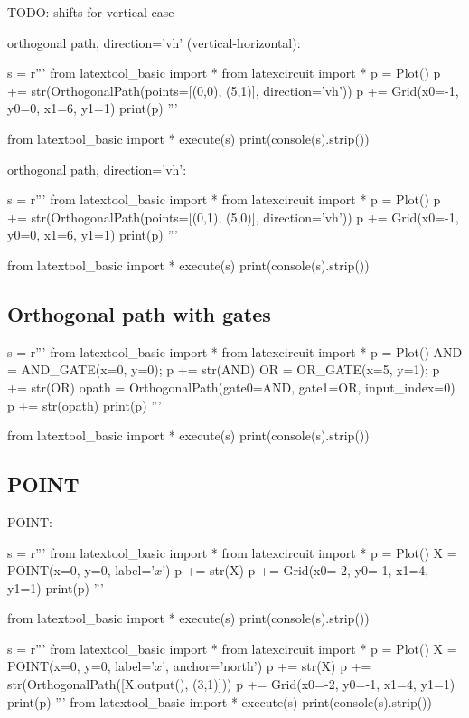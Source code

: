 TODO: shifts for vertical case


\newpage
orthogonal path, direction='vh' (vertical-horizontal):
\begin{python}
s = r'''
from latextool_basic import *
from latexcircuit import *
p = Plot()
p += str(OrthogonalPath(points=[(0,0), (5,1)], direction='vh'))
p += Grid(x0=-1, y0=0, x1=6, y1=1)
print(p)
'''

from latextool_basic import *
execute(s)
print(console(s).strip())
\end{python}



orthogonal path, direction='vh':
\begin{python}
s = r'''
from latextool_basic import *
from latexcircuit import *
p = Plot()
p += str(OrthogonalPath(points=[(0,1), (5,0)], direction='vh'))
p += Grid(x0=-1, y0=0, x1=6, y1=1)
print(p)
'''

from latextool_basic import *
execute(s)
print(console(s).strip())
\end{python}


\newpage
\subsection{Orthogonal path with gates}
\begin{python}
s = r'''
from latextool_basic import *
from latexcircuit import *
p = Plot()
AND = AND_GATE(x=0, y=0); p += str(AND)
OR = OR_GATE(x=5, y=1); p += str(OR)
opath = OrthogonalPath(gate0=AND, gate1=OR, input_index=0)
p += str(opath)
print(p)
'''

from latextool_basic import *
execute(s)
print(console(s).strip())
\end{python}




\newpage
\subsection{POINT}
POINT:
\begin{python}
s = r'''
from latextool_basic import *
from latexcircuit import *
p = Plot()
X = POINT(x=0, y=0, label='$x$')
p += str(X)
p += Grid(x0=-2, y0=-1, x1=4, y1=1)
print(p)
'''

from latextool_basic import *
execute(s)
print(console(s).strip())
\end{python}



\begin{python}
s = r'''
from latextool_basic import *
from latexcircuit import *
p = Plot()
X = POINT(x=0, y=0, label='$x$', anchor='north')
p += str(X)
p += str(OrthogonalPath([X.output(), (3,1)]))
p += Grid(x0=-2, y0=-1, x1=4, y1=1)
print(p)
'''
from latextool_basic import *
execute(s)
print(console(s).strip())
\end{python}




